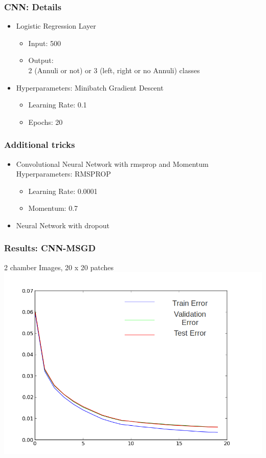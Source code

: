 \documentclass[14pt,mathserif]{beamer}
\begin{document}
\frame
{
  \frametitle{CNN: Details}

  \setlength{\leftmargini}{0em}
  \setlength{\leftmarginii}{1em}
   \begin{itemize}
     \setlength{\itemsep}{1em}
      \item Logistic Regression Layer
      	\begin{itemize}
      	\item Input: 500
        	\item Output: \\2 (Annuli or not) or 3 (left, right or no Annuli) classes 
        	\end{itemize}
      \item Hyperparameters: Minibatch Gradient Descent
      	\begin{itemize}
      	\item Learning Rate: 0.1
      	\item Epochs: 20
        	\end{itemize}
   \end{itemize}
  
}
\frame
{
  \frametitle{Additional tricks}
	\begin{itemize}
	\item Convolutional Neural Network with rmsprop and Momentum \\
         Hyperparameters: RMSPROP
      	\begin{itemize}
      	\item Learning Rate: 0.0001
        	\item Momentum: 0.7 
        	\end{itemize}
     \item Neural Network with dropout
   \end{itemize}
}

\frame
{
  \frametitle{Results: CNN-MSGD}
	2 chamber Images, 20 x 20 patches  
  	\includegraphics[scale=0.35]{errorcnn2ch20px.png} 
}
\end{document}
